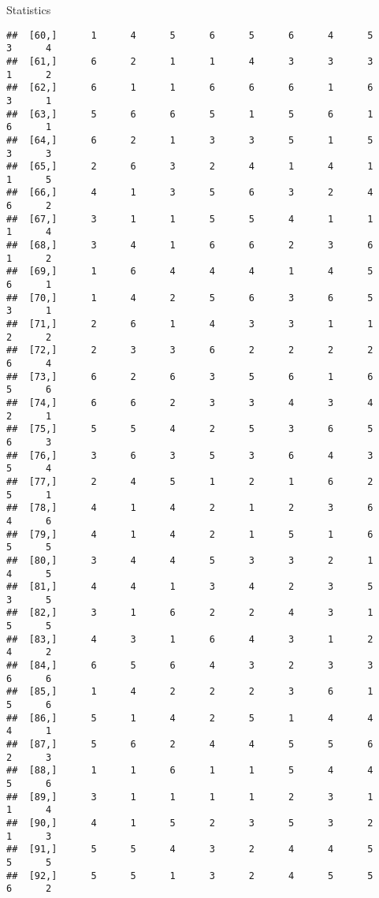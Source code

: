 \documentclass[
  ignorenonframetext,
]{beamer}
\begin{document}
\begin{frame}[fragile]{Statistics}
\begin{verbatim}
##  [60,]      1      4      5      6      5      6      4      5      3      4
##  [61,]      6      2      1      1      4      3      3      3      1      2
##  [62,]      6      1      1      6      6      6      1      6      3      1
##  [63,]      5      6      6      5      1      5      6      1      6      1
##  [64,]      6      2      1      3      3      5      1      5      3      3
##  [65,]      2      6      3      2      4      1      4      1      1      5
##  [66,]      4      1      3      5      6      3      2      4      6      2
##  [67,]      3      1      1      5      5      4      1      1      1      4
##  [68,]      3      4      1      6      6      2      3      6      1      2
##  [69,]      1      6      4      4      4      1      4      5      6      1
##  [70,]      1      4      2      5      6      3      6      5      3      1
##  [71,]      2      6      1      4      3      3      1      1      2      2
##  [72,]      2      3      3      6      2      2      2      2      6      4
##  [73,]      6      2      6      3      5      6      1      6      5      6
##  [74,]      6      6      2      3      3      4      3      4      2      1
##  [75,]      5      5      4      2      5      3      6      5      6      3
##  [76,]      3      6      3      5      3      6      4      3      5      4
##  [77,]      2      4      5      1      2      1      6      2      5      1
##  [78,]      4      1      4      2      1      2      3      6      4      6
##  [79,]      4      1      4      2      1      5      1      6      5      5
##  [80,]      3      4      4      5      3      3      2      1      4      5
##  [81,]      4      4      1      3      4      2      3      5      3      5
##  [82,]      3      1      6      2      2      4      3      1      5      5
##  [83,]      4      3      1      6      4      3      1      2      4      2
##  [84,]      6      5      6      4      3      2      3      3      6      6
##  [85,]      1      4      2      2      2      3      6      1      5      6
##  [86,]      5      1      4      2      5      1      4      4      4      1
##  [87,]      5      6      2      4      4      5      5      6      2      3
##  [88,]      1      1      6      1      1      5      4      4      5      6
##  [89,]      3      1      1      1      1      2      3      1      1      4
##  [90,]      4      1      5      2      3      5      3      2      1      3
##  [91,]      5      5      4      3      2      4      4      5      5      5
##  [92,]      5      5      1      3      2      4      5      5      6      2

\end{verbatim}
\end{frame}
\end{document}
